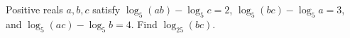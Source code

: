Positive reals $a,b,c$ satisfy $\log_5(ab)-\log_5c=2$, $\log_5(bc)-\log_5a=3$, and $\log_5(ac)-\log_5b=4$. Find $\log_{25}(bc)$.
